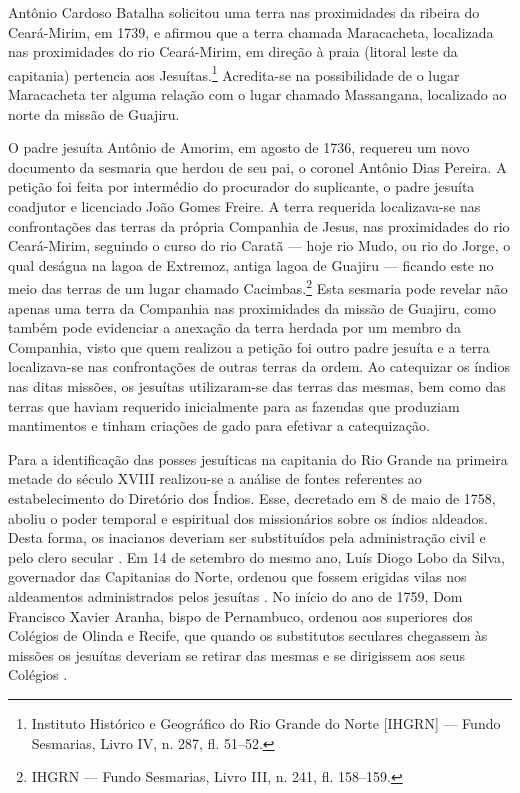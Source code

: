 \begin{refsection}
Antônio Cardoso Batalha solicitou uma terra nas proximidades da ribeira do Ceará-Mirim, em 1739, e afirmou que a terra chamada Maracacheta, localizada nas proximidades do rio Ceará-Mirim, em direção à praia (litoral leste da capitania) pertencia aos Jesuítas.\footnote{Instituto Histórico e Geográfico do Rio Grande do Norte [IHGRN] --- Fundo Sesmarias, Livro IV, n. 287, fl. 51--52.} Acredita-se na possibilidade de o lugar Maracacheta ter alguma relação com o lugar chamado Massangana, localizado ao norte da missão de Guajiru.  

O padre jesuíta Antônio de Amorim, em agosto de 1736, requereu um novo documento da sesmaria que herdou de seu pai, o coronel Antônio Dias Pereira. A petição foi feita por intermédio do procurador do suplicante, o padre jesuíta coadjutor e licenciado João Gomes Freire. A terra requerida localizava-se nas confrontações das terras da própria Companhia de Jesus, nas proximidades do rio Ceará-Mirim, seguindo o curso do rio Caratã --- hoje rio Mudo, ou rio do Jorge, o qual deságua na lagoa de Extremoz, antiga lagoa de Guajiru \cite[p.~79]{Cascudo1968} --- ficando este no meio das terras de um lugar chamado Cacimbas.\footnote{IHGRN --- Fundo Sesmarias, Livro III, n. 241, fl. 158--159.} Esta sesmaria pode revelar não apenas uma terra da Companhia nas proximidades da missão de Guajiru, como também pode evidenciar a anexação da terra herdada por um membro da Companhia, visto que quem realizou a petição foi outro padre jesuíta e a terra localizava-se nas confrontações de outras terras da ordem. Ao catequizar os índios nas ditas missões, os jesuítas utilizaram-se das terras das mesmas, bem como das terras que haviam requerido inicialmente para as fazendas que produziam mantimentos e tinham criações de gado para efetivar a catequização.  

Para a identificação das posses jesuíticas na capitania do Rio Grande na primeira metade do século XVIII realizou-se a análise de fontes referentes ao estabelecimento do Diretório dos Índios. Esse, decretado em 8 de maio de 1758, aboliu o poder temporal e espiritual dos missionários sobre os índios aldeados. Desta forma, os inacianos deveriam ser substituídos pela administração civil e pelo clero secular \cite[p.~18--20]{Couto1990}. Em 14 de setembro do mesmo ano, Luís Diogo Lobo da Silva, governador das Capitanias do Norte, ordenou que fossem erigidas vilas nos aldeamentos administrados pelos jesuítas \cite[p.~43--46]{Couto1990}. No início do ano de 1759, Dom Francisco Xavier Aranha, bispo de Pernambuco, ordenou aos superiores dos Colégios de Olinda e Recife, que quando os substitutos seculares chegassem às missões os jesuítas deveriam se retirar das mesmas e se dirigissem aos seus Colégios \cite[p.~102]{Lopes2005}. 


\end{refsection}

